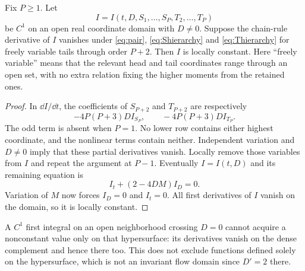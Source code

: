 \begin{theorem}
\label{thm:nohead}
Fix $P\ge1$. Let
\[
 I=I(t,D,S_1,\ldots,S_P,T_2,\ldots,T_P)
\]
be $C^1$ on an open real coordinate domain with $D\ne0$. Suppose
the chain-rule derivative of $I$ vanishes under
\eqref{eq:pair}, \eqref{eq:Shierarchy} and \eqref{eq:Thierarchy}
for freely variable tails through order $P+2$. Then $I$ is locally
constant. Here ``freely variable'' means that the relevant head and
tail coordinates range through an open set, with no extra relation
fixing the higher moments from the retained ones.
\end{theorem}
\begin{proof}
In $\dd I/\dd t$, the coefficients of $S_{P+2}$ and $T_{P+2}$
are respectively
\begin{equation}
 -4P(P+3)D I_{S_P},\qquad -4P(P+3)D I_{T_P}.
 \label{eq:highest-tail}
\end{equation}
The odd term is absent when $P=1$. No lower row contains either
highest coordinate, and the nonlinear terms contain neither.
Independent variation and $D\ne0$ imply that these partial
derivatives vanish. Locally remove those variables from $I$ and
repeat the argument at $P-1$. Eventually $I=I(t,D)$ and its
remaining equation is
\[
 I_t+(2-4DM)I_D=0.
\]
Variation of $M$ now forces $I_D=0$ and $I_t=0$. All first
derivatives of $I$ vanish on the domain, so it is locally constant.
\end{proof}

A $C^1$ first integral on an open neighborhood crossing $D=0$ cannot
acquire a nonconstant value only on that hypersurface: its derivatives
vanish on the dense complement and hence there too. This does not
exclude functions defined solely on the hypersurface, which is not an
invariant flow domain since $D'=2$ there.

